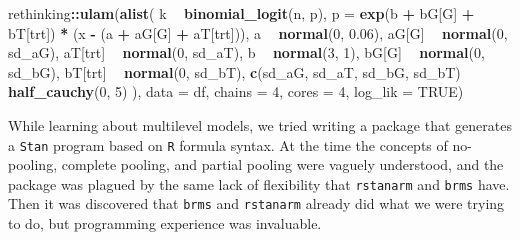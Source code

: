 \documentclass[11pt, oneside, openany]{scrbook}
\newenvironment{Shaded}{\begin{snugshade}}{\end{snugshade}}
\newcommand{\DataTypeTok}[1]{\textcolor[rgb]{0.13,0.29,0.53}{#1}}
\newcommand{\DecValTok}[1]{\textcolor[rgb]{0.00,0.00,0.81}{#1}}
\newcommand{\FloatTok}[1]{\textcolor[rgb]{0.00,0.00,0.81}{#1}}
\newcommand{\KeywordTok}[1]{\textcolor[rgb]{0.13,0.29,0.53}{\textbf{#1}}}
\newcommand{\NormalTok}[1]{#1}
\newcommand{\OperatorTok}[1]{\textcolor[rgb]{0.81,0.36,0.00}{\textbf{#1}}}
\newcommand{\OtherTok}[1]{\textcolor[rgb]{0.56,0.35,0.01}{#1}}
\newcommand{\StringTok}[1]{\textcolor[rgb]{0.31,0.60,0.02}{#1}}
\begin{document}

\begin{Shaded}
\begin{Highlighting}[]
\NormalTok{rethinking}\OperatorTok{::}\KeywordTok{ulam}\NormalTok{(}\KeywordTok{alist}\NormalTok{(}
\NormalTok{  k }\OperatorTok{~}\StringTok{ }\KeywordTok{binomial_logit}\NormalTok{(n, p),}
  \DataTypeTok{p =} \KeywordTok{exp}\NormalTok{(b }\OperatorTok{+}\StringTok{ }\NormalTok{bG[G] }\OperatorTok{+}\StringTok{ }\NormalTok{bT[trt]) }\OperatorTok{*}\StringTok{ }\NormalTok{(x }\OperatorTok{-}\StringTok{ }\NormalTok{(a }\OperatorTok{+}\StringTok{ }\NormalTok{aG[G] }\OperatorTok{+}\StringTok{ }\NormalTok{aT[trt])),}
\NormalTok{  a }\OperatorTok{~}\StringTok{ }\KeywordTok{normal}\NormalTok{(}\DecValTok{0}\NormalTok{, }\FloatTok{0.06}\NormalTok{),}
\NormalTok{  aG[G] }\OperatorTok{~}\StringTok{ }\KeywordTok{normal}\NormalTok{(}\DecValTok{0}\NormalTok{, sd_aG),}
\NormalTok{  aT[trt] }\OperatorTok{~}\StringTok{ }\KeywordTok{normal}\NormalTok{(}\DecValTok{0}\NormalTok{, sd_aT),}
\NormalTok{  b }\OperatorTok{~}\StringTok{ }\KeywordTok{normal}\NormalTok{(}\DecValTok{3}\NormalTok{, }\DecValTok{1}\NormalTok{),}
\NormalTok{  bG[G] }\OperatorTok{~}\StringTok{ }\KeywordTok{normal}\NormalTok{(}\DecValTok{0}\NormalTok{, sd_bG),}
\NormalTok{  bT[trt] }\OperatorTok{~}\StringTok{ }\KeywordTok{normal}\NormalTok{(}\DecValTok{0}\NormalTok{, sd_bT),}
  \KeywordTok{c}\NormalTok{(sd_aG, sd_aT, sd_bG, sd_bT) }\OperatorTok{~}\StringTok{ }\KeywordTok{half_cauchy}\NormalTok{(}\DecValTok{0}\NormalTok{, }\DecValTok{5}\NormalTok{)}
\NormalTok{), }\DataTypeTok{data =}\NormalTok{ df, }\DataTypeTok{chains =} \DecValTok{4}\NormalTok{, }\DataTypeTok{cores =} \DecValTok{4}\NormalTok{, }\DataTypeTok{log_lik =} \OtherTok{TRUE}\NormalTok{)}
\end{Highlighting}
\end{Shaded}


While learning about multilevel models, we tried writing a package that generates a \texttt{Stan} program based on \texttt{R} formula syntax. At the time the concepts of no-pooling, complete pooling, and partial pooling were vaguely understood, and the package was plagued by the same lack of flexibility that \texttt{rstanarm} and \texttt{brms} have. Then it was discovered that \texttt{brms} and \texttt{rstanarm} already did what we were trying to do, but programming experience was invaluable.
\end{document}
